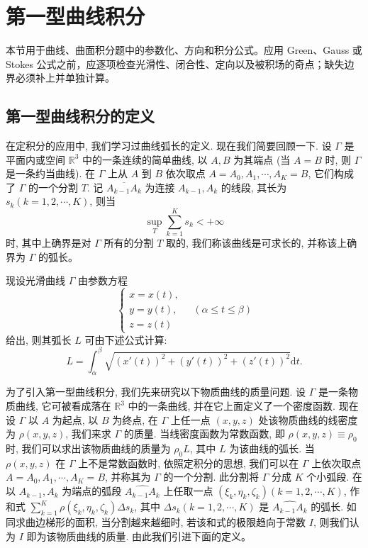 \documentclass[12pt,fontset=fandol]{ctexart}
\begin{document}
\section{第一型曲线积分}\label{course-16-1}
本节用于曲线、曲面积分题中的参数化、方向和积分公式。应用 Green、Gauss 或 Stokes 公式之前，应逐项检查光滑性、闭合性、定向以及被积场的奇点；缺失边界必须补上并单独计算。

\subsection{第一型曲线积分的定义}

在定积分的应用中, 我们学习过曲线弧长的定义. 现在我们简要回顾一下. 设 $\Gamma$ 是平面内或空间 $\mathbb R^3$ 中的一条连续的简单曲线, 以 $A,B$ 为其端点 (当 $A=B$ 时, 则 $\Gamma$ 是一条约当曲线). 在 $\Gamma$ 上从 $A$ 到 $B$ 依次取点 $A=A_0,A_1,\cdots,A_K=B$, 它们构成了 $\Gamma$ 的一个分割 $T$. 记 $\overline{A_{k-1}A_k}$ 为连接 $A_{k-1},A_k$ 的线段, 其长为 $s_k(k=1,2,\cdots,K)$, 则当
\[
  \sup_T\sum_{k=1}^K s_k<+\infty
\]
时, 其中上确界是对 $\Gamma$ 所有的分割 $T$ 取的, 我们称该曲线是可求长的, 并称该上确界为 $\Gamma$ 的弧长。

现设光滑曲线 $\Gamma$ 由参数方程
\[
  \begin{cases}
    x=x(t),\\
    y=y(t),\\
    z=z(t)
  \end{cases}
  \quad(\alpha\leqslant t\leqslant \beta)
\]
给出, 则其弧长 $L$ 可由下述公式计算:
\[
  L=\int_\alpha^\beta \sqrt{(x'(t))^2+(y'(t))^2+(z'(t))^2}\mathrm dt.
\]

为了引入第一型曲线积分, 我们先来研究以下物质曲线的质量问题. 设 $\Gamma$ 是一条物质曲线, 它可被看成落在 $\mathbb R^3$ 中的一条曲线, 并在它上面定义了一个密度函数. 现在设 $\Gamma$ 以 $A$ 为起点, 以 $B$ 为终点, 在 $\Gamma$ 上任一点 $(x,y,z)$ 处该物质曲线的线密度为 $\rho(x,y,z)$, 我们来求 $\Gamma$ 的质量. 当线密度函数为常数函数, 即 $\rho(x,y,z)\equiv\rho_0$ 时, 我们可以求出该物质曲线的质量为 $\rho_0L$, 其中 $L$ 为该曲线的弧长. 当 $\rho(x,y,z)$ 在 $\Gamma$ 上不是常数函数时, 依照定积分的思想, 我们可以在 $\Gamma$ 上依次取点 $A=A_0,A_1,\cdots,A_K=B$, 并称其为 $\Gamma$ 的一个分割. 此分割将 $\Gamma$ 分成 $K$ 个小弧段. 在以 $A_{k-1},A_k$ 为端点的弧段 $\widehat{A_{k-1}A_k}$ 上任取一点 $(\xi_k,\eta_k,\zeta_k)(k=1,2,\cdots,K)$, 作和式 $\sum\limits_{k=1}^K \rho(\xi_k,\eta_k,\zeta_k)\Delta s_k$, 其中 $\Delta s_k(k=1,2,\cdots,K)$ 是 $\widehat{A_{k-1}A_k}$ 的弧长. 如同求曲边梯形的面积, 当分割越来越细时, 若该和式的极限趋向于常数 $I$, 则我们认为 $I$ 即为该物质曲线的质量. 由此我们引进下面的定义。
\end{document}
